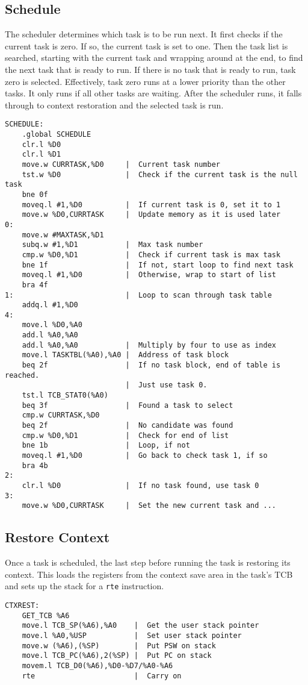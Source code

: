 \documentclass[10pt, openany]{book}
\begin{document}
\subsection{Schedule}
The scheduler determines which task is to be run next.  It first checks if the current task is zero.  If so, the current task is set to one.  Then the task list is searched, starting with the current task and wrapping around at the end, to find the next task that is ready to run.  If there is no task that is ready to run, task zero is selected.  Effectively, task zero runs at a lower priority than the other tasks.  It only runs if all other tasks are waiting.  After the scheduler runs, it falls through to context restoration and the selected task is run.
\begin{lstlisting}
SCHEDULE:
    .global SCHEDULE
    clr.l %D0
    clr.l %D1
    move.w CURRTASK,%D0     |  Current task number
    tst.w %D0               |  Check if the current task is the null task
    bne 0f
    moveq.l #1,%D0          |  If current task is 0, set it to 1
    move.w %D0,CURRTASK     |  Update memory as it is used later
0:
    move.w #MAXTASK,%D1
    subq.w #1,%D1           |  Max task number
    cmp.w %D0,%D1           |  Check if current task is max task
    bne 1f                  |  If not, start loop to find next task
    moveq.l #1,%D0          |  Otherwise, wrap to start of list
    bra 4f
1:                          |  Loop to scan through task table
    addq.l #1,%D0
4:
    move.l %D0,%A0
    add.l %A0,%A0
    add.l %A0,%A0           |  Multiply by four to use as index
    move.l TASKTBL(%A0),%A0 |  Address of task block
    beq 2f                  |  If no task block, end of table is reached.
                            |  Just use task 0.
    tst.l TCB_STAT0(%A0)
    beq 3f                  |  Found a task to select
    cmp.w CURRTASK,%D0
    beq 2f                  |  No candidate was found
    cmp.w %D0,%D1           |  Check for end of list
    bne 1b                  |  Loop, if not
    moveq.l #1,%D0          |  Go back to check task 1, if so
    bra 4b
2:
    clr.l %D0               |  If no task found, use task 0
3:
    move.w %D0,CURRTASK     |  Set the new current task and ...
\end{lstlisting}
\subsection{Restore Context}
Once a task is scheduled, the last step before running the task is restoring its context.  This loads the registers from the context save area in the task's TCB and sets up the stack for a \verb|rte| instruction.
\begin{lstlisting}
CTXREST:
    GET_TCB %A6
    move.l TCB_SP(%A6),%A0    |  Get the user stack pointer
    move.l %A0,%USP           |  Set user stack pointer
    move.w (%A6),(%SP)        |  Put PSW on stack
    move.l TCB_PC(%A6),2(%SP) |  Put PC on stack
    movem.l TCB_D0(%A6),%D0-%D7/%A0-%A6
    rte                       |  Carry on
\end{lstlisting}
\end{document}
